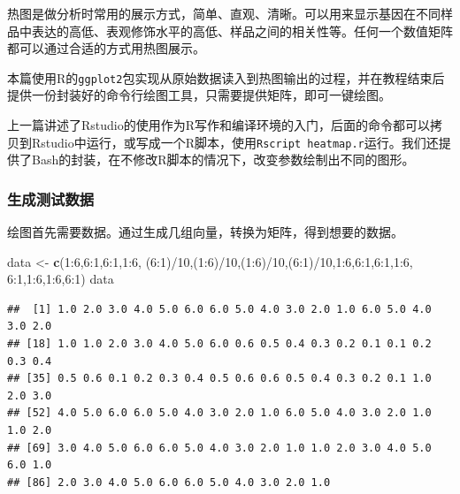 \documentclass[]{article}
\newenvironment{Shaded}{\begin{snugshade}}{\end{snugshade}}
\newcommand{\KeywordTok}[1]{\textcolor[rgb]{0.13,0.29,0.53}{\textbf{{#1}}}}
\newcommand{\DecValTok}[1]{\textcolor[rgb]{0.00,0.00,0.81}{{#1}}}
\newcommand{\StringTok}[1]{\textcolor[rgb]{0.31,0.60,0.02}{{#1}}}
\newcommand{\NormalTok}[1]{{#1}}
\numberwithin{figure}{section}
\numberwithin{table}{section}
\theoremstyle{definition}
\theoremstyle{definition}
\theoremstyle{definition}
\theoremstyle{remark}
\begin{document}
热图是做分析时常用的展示方式，简单、直观、清晰。可以用来显示基因在不同样品中表达的高低、表观修饰水平的高低、样品之间的相关性等。任何一个数值矩阵都可以通过合适的方式用热图展示。

本篇使用R的\texttt{ggplot2}包实现从原始数据读入到热图输出的过程，并在教程结束后提供一份封装好的命令行绘图工具，只需要提供矩阵，即可一键绘图。

上一篇讲述了Rstudio的使用作为R写作和编译环境的入门，后面的命令都可以拷贝到Rstudio中运行，或写成一个R脚本，使用\texttt{Rscript\ heatmap.r}运行。我们还提供了Bash的封装，在不修改R脚本的情况下，改变参数绘制出不同的图形。

\subsubsection{生成测试数据}

绘图首先需要数据。通过生成几组向量，转换为矩阵，得到想要的数据。

\begin{Shaded}
\begin{Highlighting}[]
\NormalTok{data <-}\StringTok{ }\KeywordTok{c}\NormalTok{(}\DecValTok{1}\NormalTok{:}\DecValTok{6}\NormalTok{,}\DecValTok{6}\NormalTok{:}\DecValTok{1}\NormalTok{,}\DecValTok{6}\NormalTok{:}\DecValTok{1}\NormalTok{,}\DecValTok{1}\NormalTok{:}\DecValTok{6}\NormalTok{, (}\DecValTok{6}\NormalTok{:}\DecValTok{1}\NormalTok{)/}\DecValTok{10}\NormalTok{,(}\DecValTok{1}\NormalTok{:}\DecValTok{6}\NormalTok{)/}\DecValTok{10}\NormalTok{,(}\DecValTok{1}\NormalTok{:}\DecValTok{6}\NormalTok{)/}\DecValTok{10}\NormalTok{,(}\DecValTok{6}\NormalTok{:}\DecValTok{1}\NormalTok{)/}\DecValTok{10}\NormalTok{,}\DecValTok{1}\NormalTok{:}\DecValTok{6}\NormalTok{,}\DecValTok{6}\NormalTok{:}\DecValTok{1}\NormalTok{,}\DecValTok{6}\NormalTok{:}\DecValTok{1}\NormalTok{,}\DecValTok{1}\NormalTok{:}\DecValTok{6}\NormalTok{,}
        \DecValTok{6}\NormalTok{:}\DecValTok{1}\NormalTok{,}\DecValTok{1}\NormalTok{:}\DecValTok{6}\NormalTok{,}\DecValTok{1}\NormalTok{:}\DecValTok{6}\NormalTok{,}\DecValTok{6}\NormalTok{:}\DecValTok{1}\NormalTok{)}
\NormalTok{data}
\end{Highlighting}
\end{Shaded}

\begin{verbatim}
##  [1] 1.0 2.0 3.0 4.0 5.0 6.0 6.0 5.0 4.0 3.0 2.0 1.0 6.0 5.0 4.0 3.0 2.0
## [18] 1.0 1.0 2.0 3.0 4.0 5.0 6.0 0.6 0.5 0.4 0.3 0.2 0.1 0.1 0.2 0.3 0.4
## [35] 0.5 0.6 0.1 0.2 0.3 0.4 0.5 0.6 0.6 0.5 0.4 0.3 0.2 0.1 1.0 2.0 3.0
## [52] 4.0 5.0 6.0 6.0 5.0 4.0 3.0 2.0 1.0 6.0 5.0 4.0 3.0 2.0 1.0 1.0 2.0
## [69] 3.0 4.0 5.0 6.0 6.0 5.0 4.0 3.0 2.0 1.0 1.0 2.0 3.0 4.0 5.0 6.0 1.0
## [86] 2.0 3.0 4.0 5.0 6.0 6.0 5.0 4.0 3.0 2.0 1.0
\end{verbatim}
\end{document}
